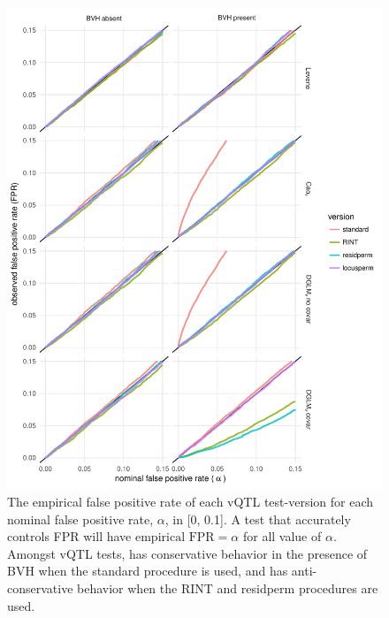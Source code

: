   \begin{figure}[hp]
      \centering
      \includegraphics[width = \linewidth]{images/vqtl_null_qqs.pdf}
      \caption[
        The empirical false positive rate of each vQTL test-version for each nominal false positive rate, $\alpha$, in {[}0, 0.1{]}.
      ]
      {
        The empirical false positive rate of each vQTL test-version for each nominal false positive rate, $\alpha$, in {[}0, 0.1{]}.
        A test that accurately controls FPR will have $\text{empirical FPR}=\alpha$ for all value of $\alpha$.
        Amongst vQTL tests, \Caov has conservative behavior in the presence of BVH when the standard procedure is used, and \DGLMv has anti-conservative behavior when the RINT and residperm procedures are used.
      }
      \label{fig:vqtl_tests_null_qqs}
  \end{figure}


